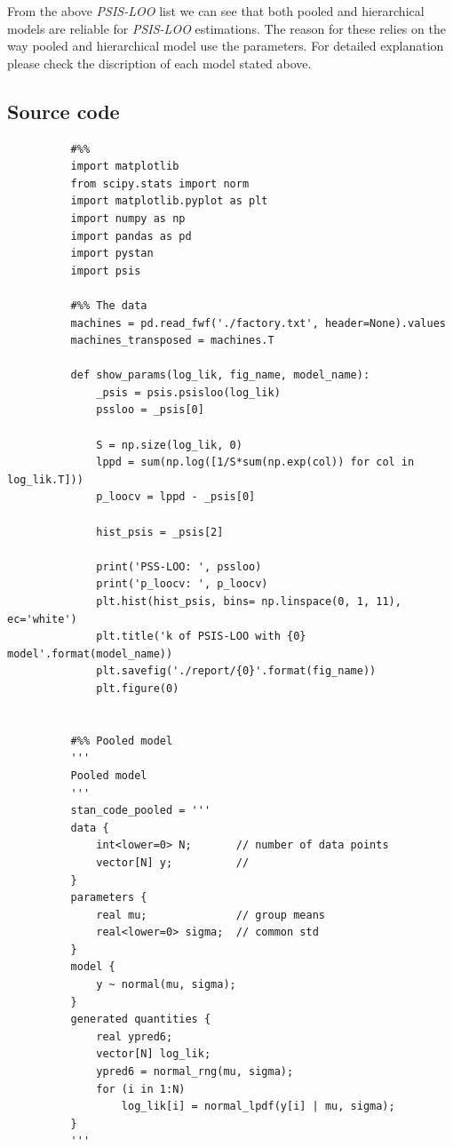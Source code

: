 \documentclass[11pt,a4paper,english]{article}
\begin{document}
        From the above \textit{PSIS-LOO} list we can see that both pooled and hierarchical models are
        reliable for \textit{PSIS-LOO} estimations. The reason for these relies on the way pooled and hierarchical model use the parameters. For detailed explanation please check the discription of each model stated above.
      \begin{appendices}
        \section{Source code}
        \begin{verbatim}
          #%%
          import matplotlib
          from scipy.stats import norm
          import matplotlib.pyplot as plt
          import numpy as np
          import pandas as pd
          import pystan
          import psis

          #%% The data
          machines = pd.read_fwf('./factory.txt', header=None).values
          machines_transposed = machines.T

          def show_params(log_lik, fig_name, model_name):
              _psis = psis.psisloo(log_lik)
              pssloo = _psis[0]

              S = np.size(log_lik, 0)
              lppd = sum(np.log([1/S*sum(np.exp(col)) for col in log_lik.T]))
              p_loocv = lppd - _psis[0]

              hist_psis = _psis[2]

              print('PSS-LOO: ', pssloo)
              print('p_loocv: ', p_loocv)
              plt.hist(hist_psis, bins= np.linspace(0, 1, 11), ec='white')
              plt.title('k of PSIS-LOO with {0} model'.format(model_name))
              plt.savefig('./report/{0}'.format(fig_name))
              plt.figure(0)


          #%% Pooled model
          '''
          Pooled model
          '''
          stan_code_pooled = '''
          data {
              int<lower=0> N;       // number of data points
              vector[N] y;          //
          }
          parameters {
              real mu;              // group means
              real<lower=0> sigma;  // common std
          }
          model {
              y ~ normal(mu, sigma);
          }
          generated quantities {
              real ypred6;
              vector[N] log_lik;
              ypred6 = normal_rng(mu, sigma);
              for (i in 1:N)
                  log_lik[i] = normal_lpdf(y[i] | mu, sigma);
          }
          '''


\end{verbatim}
\end{appendices}
\end{document}
